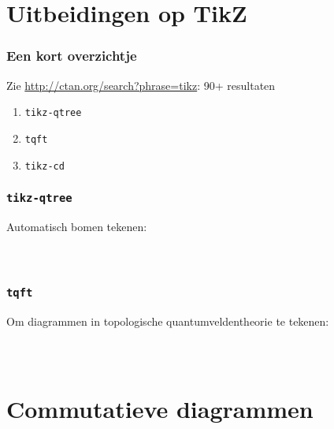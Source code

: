 \section{Uitbeidingen op TikZ}

\begin{frame}
  \frametitle{Een kort overzichtje}

  Zie \url{http://ctan.org/search?phrase=tikz}: 90+ resultaten

  \begin{enumerate}
    \item \texttt{tikz-qtree}
    \item \texttt{tqft}
    \item \texttt{tikz-cd}
  \end{enumerate}
\end{frame}

\begin{frame}
  \frametitle{\texttt{tikz-qtree}}
  
  Automatisch bomen tekenen:
  \begin{columns}
    \begin{column}{.6\textwidth}
      \inputminted[fontsize = \scriptsize]{latex}{tikz/tikz-qtree.tikz}
    \end{column}
    \begin{column}{.4\textwidth}
      
    \end{column}
  \end{columns}
\end{frame}

\begin{frame}
  \frametitle{\texttt{tqft}}
  
  Om diagrammen in topologische quantumveldentheorie te tekenen:
  \begin{columns}
    \begin{column}{.6\textwidth}
      \inputminted[fontsize = \scriptsize]{latex}{tikz/tqft.tikz}
    \end{column}
    \begin{column}{.4\textwidth}
      
    \end{column}
  \end{columns}
\end{frame}

\section{Commutatieve diagrammen}

